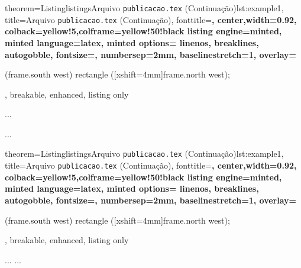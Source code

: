 \documentclass[10pt]{beamer}
\begin{document}
\begin{frame}{}
    \begin{tcblisting}{
        theorem={Listing}{listings}{Arquivo {\tt publicacao.tex} (Continuação)}{lst:example1},
        title=Arquivo {\tt publicacao.tex} (Continuação),
        fonttitle=\small\bfseries,
        center,width=0.92\paperwidth,
        colback=yellow!5,colframe=yellow!50!black
        listing engine=minted,
        minted language=latex,
        minted options={%
            linenos,
            breaklines,
            autogobble,
            fontsize=\small,
            numbersep=2mm,
            baselinestretch=1},
        overlay={%
        \begin{tcbclipinterior}
            \fill[gray!25] (frame.south west) rectangle ([xshift=4mm]frame.north west);
        \end{tcbclipinterior}},
        breakable, enhanced, listing only}
        ...
        
        
        
        \inicioIntroducao %
        ...
    \end{tcblisting}
\end{frame}

\begin{frame}{}
    \begin{tcblisting}{
        theorem={Listing}{listings}{Arquivo {\tt publicacao.tex} (Continuação)}{lst:example1},
        title=Arquivo {\tt publicacao.tex} (Continuação),
        fonttitle=\small\bfseries,
        center,width=0.92\paperwidth,
        colback=yellow!5,colframe=yellow!50!black
        listing engine=minted,
        minted language=latex,
        minted options={%
            linenos,
            breaklines,
            autogobble,
            fontsize=\small,
            numbersep=2mm,
            baselinestretch=1},
        overlay={%
        \begin{tcbclipinterior}
            \fill[gray!25] (frame.south west) rectangle ([xshift=4mm]frame.north west);
        \end{tcbclipinterior}},
        breakable, enhanced, listing only}
    ...
    ...
    \end{tcblisting}
\end{frame}
\end{document}
